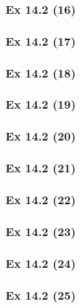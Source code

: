 \subsubsection{Ex 14.2 (16)}\label{sec:Ex_14.2.16}

\subsubsection{Ex 14.2 (17)}\label{sec:Ex_14.2.17}

\subsubsection{Ex 14.2 (18)}\label{sec:Ex_14.2.18}

\subsubsection{Ex 14.2 (19)}\label{sec:Ex_14.2.19}

\subsubsection{Ex 14.2 (20)}\label{sec:Ex_14.2.20}

\newpage		%

\subsubsection{Ex 14.2 (21)}\label{sec:Ex_14.2.21}

\subsubsection{Ex 14.2 (22)}\label{sec:Ex_14.2.22}

\subsubsection{Ex 14.2 (23)}\label{sec:Ex_14.2.23}

\subsubsection{Ex 14.2 (24)}\label{sec:Ex_14.2.24}

\subsubsection{Ex 14.2 (25)}\label{sec:Ex_14.2.25}

